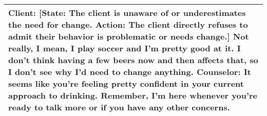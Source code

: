 \begin{table*}[tb]
\begin{tabularx}{\textwidth}{X}
Client: {\color{blue} [State: The client is unaware of or underestimates the need for change. Action: The client directly refuses to admit their behavior is problematic or needs change.]} Not really, I mean, I play soccer and I'm pretty good at it. I don’t think having a few beers now and then affects that, so I don’t see why I’d need to change anything. \newline
Counselor: It seems like you're feeling pretty confident in your current approach to drinking. Remember, I'm here whenever you're ready to talk more or if you have any other concerns. \newline
\\ \bottomrule
\end{tabularx}
\caption{A failure example from our simulated client. For better presentation, the instruction (in {\color{blue} blue}) is placed before the client's utterance, which should follow the counselor's utterance. The counselor fails to find out the motivation by asking self-exploration and ends the counseling.}
\label{tab:failure example}
\end{table*}



